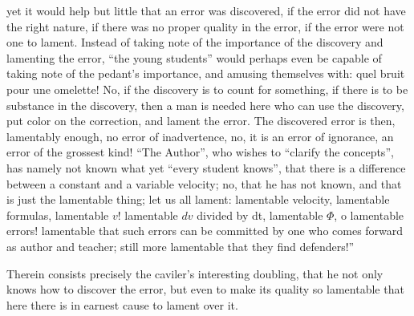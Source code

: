 \documentclass[12pt,a4paper,openany]{book}
\newcommand{\opage}[1]{\marginnote{\footnotesize\textit{[#1]}}}
\begin{document}
yet it would help but little that an error was discovered, if
the error did not have the right nature, if there was no
proper quality in the error, if the error were not one to
lament. Instead of taking note of the importance of the discovery
and lamenting the error, ``the young students'' would perhaps even
be capable of taking note of the pedant's importance, and amusing themselves
\opage{11}\setcounter{footnote}{0}%
with: quel bruit pour une omelette! No, if the discovery is
to count for something, if there is to be substance in the discovery, then
a man is needed here who can use the discovery, put color
on the correction, and lament the error. The discovered error
is then, lamentably enough, no error of inadvertence, no, it is an
error of ignorance, an error of the grossest kind! ``The Author'', who
wishes to ``clarify the concepts'', has namely not known what yet
``every student knows'', that there is a difference between a
constant and a variable velocity; no, that he has not
known, and that is just the lamentable thing; let us all lament:
lamentable velocity, lamentable formulas, lamentable $v$! lamentable
$dv$ divided by dt, lamentable $\Phi$, o lamentable errors! lamentable that such errors can be committed by one who
comes forward as author and teacher; still
more lamentable that they find defenders!''

Therein consists precisely the caviler's interesting doubling,
that he not only knows how to discover the error, but even to
make its quality so lamentable that here there is in earnest cause
to lament over it.
\end{document}
